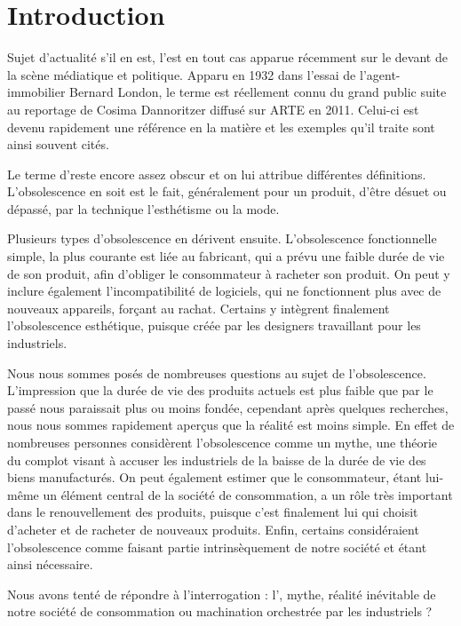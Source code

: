 \chapter*{Introduction}

\setcounter{page}{1}

Sujet d'actualité s'il en est, l'\op est en tout cas apparue récemment sur le devant de la scène médiatique et politique. Apparu en 1932 dans l'essai de l'agent-immobilier Bernard London, le terme est réellement connu du grand public suite au reportage de Cosima Dannoritzer diffusé sur ARTE en 2011. Celui-ci est devenu rapidement une référence en la matière et les exemples qu'il traite sont ainsi souvent cités.

\smallbreak Le terme d'\op reste encore assez obscur et on lui attribue différentes définitions. L'obsolescence en soit est le fait, généralement pour un produit, d'être désuet ou dépassé, par la technique l'esthétisme ou la mode.

\smallbreak Plusieurs types d'obsolescence en dérivent ensuite. L’obsolescence fonctionnelle simple, la plus courante est liée au fabricant, qui a prévu une faible durée de vie de son produit, afin d'obliger le consommateur à racheter son produit. On peut y inclure également l'incompatibilité de logiciels, qui ne fonctionnent plus avec de nouveaux appareils, forçant au rachat. Certains y intègrent finalement l'obsolescence esthétique, puisque créée par les designers travaillant pour les industriels.

\smallbreak Nous nous sommes posés de nombreuses questions au sujet de l'obsolescence. L'impression que la durée de vie des produits actuels est plus faible que par le passé nous paraissait plus ou moins fondée, cependant après quelques recherches, nous nous sommes rapidement aperçus que la réalité est moins simple. En effet de nombreuses personnes considèrent l'obsolescence comme un mythe, une théorie du complot visant à accuser les industriels de la baisse de la durée de vie des biens manufacturés. On peut également estimer que le consommateur, étant lui-même un élément central de la société de consommation, a un rôle très important dans le renouvellement des produits, puisque c'est finalement lui qui choisit d'acheter et de racheter de nouveaux produits. Enfin, certains considéraient l'obsolescence comme faisant partie intrinsèquement de notre société et étant ainsi nécessaire.

\bigbreak Nous avons tenté de répondre à l'interrogation : l'\op, mythe, réalité inévitable de notre société de consommation ou machination orchestrée par les industriels ?

